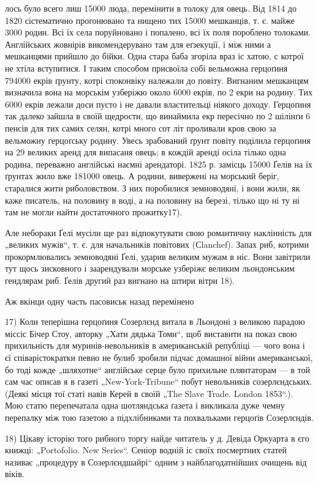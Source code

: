 лось було всего лиш 15000 люда, перемінити в толоку для овець. Від 1814 до 1820 сістематично прогонювано та нищено тих 15000 мешканців, т. є. майже 3000 родин. Всі їх села поруйновано і попалено, всі їх поля пороблено толоками. Англійських жовнірів викомендерувано там для еґзекуції, і між ними а мешканцями прийшло до бійки. Одна
стара баба згоріла враз іс хатою, с котрої не хтіла вступитися. І таким способом присвоїла собі вельможна герцоґиня 794000 екрів ґрунту, котрі споконвіку належали до
повіту. Вигнаним мешканцям визначила вона на морськім узберіжю около 6000 екрів, по 2 екри на родину. Тих 6000 екрів лежали доси пусто і не давали властительці ніякого
доходу. Герцоґиня так далеко зайшла в своїй щедрости, що винаймила екр пересічно по 2 шілінґи 6 пенсів для тих самих селян, котрі много сот літ проливали кров свою за
вельможну герцоґську родину. Увесь зрабований ґрунт повіту поділила герцоґиня на 29 великих аренд для випасаня овець; в кождій аренді осіла тілько одна родина, переважно англійські наємні арендаторі. 1825 р. замісць 15000 Ґелів на їх ґрунтах жило вже 181000 овець. А родини, вивержені на морський беріг, старалися жити риболовством. З них поробилися земноводяні, і вони жили, як каже писатель, на половину в воді, а на половину на березі, тілько що ні ту ні там не могли найти достаточного прожитку17).

Але небораки Ґелі мусіли ще раз відпокутувати свою романтичну наклінність для „великих мужів“, т. є. для начальників повітових (Сlanchef). Запах риб, котрими прокормлювались земноводяні Ґелі, ударив великим мужам в ніс. Вони завітрили тут щось зисковного і заарендували морське узберіжє великим льондонським гендлярам риб. Ґелів другий раз вигнано на штири вітри 18).

Аж вкінци одну часть пасовиськ назад перемінено

17) Коли теперішна герцоґиня Созерлєнд витала в Льондоні з великою парадою міссіс Бічер Стоу, авторку „Хати дядька Томи“, щоб виставити на показ свою прихильність для муринів-невольників в американській републіці — чого вона і єї співарістократки певно не булиб зробили підчас домашної війни американської, бо тоді кожде „шляхотне“ англійське серце було прихильне плянтаторам — в той сам час описав
я в газеті „New-York-Tribune“ побут невольників созерлєндських. (Деякі місця тої статі навів Керей в своїй „The Slave Trade. London 1853“.). Мою статю перепечатала одна шотляндська ґазета і викликала дуже чемну перепалку між тою ґазетою а підхлібниками та похвальками герцоґів Созерлєндів.

18) Цікаву історію того рибного торгу найде читатель у д. Девіда Оркуарта в єго книжці: „Portofolio. New Series“. Сеніор водній іс своїх посмертних статей називає „процедуру в Созерлєндшайрі“ одним з найблагодатнійших очищень від віків.
